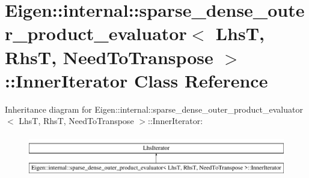\hypertarget{class_eigen_1_1internal_1_1sparse__dense__outer__product__evaluator_1_1_inner_iterator}{}\section{Eigen\+::internal\+::sparse\+\_\+dense\+\_\+outer\+\_\+product\+\_\+evaluator$<$ LhsT, RhsT, Need\+To\+Transpose $>$\+::Inner\+Iterator Class Reference}
\label{class_eigen_1_1internal_1_1sparse__dense__outer__product__evaluator_1_1_inner_iterator}
Inheritance diagram for Eigen\+::internal\+::sparse\+\_\+dense\+\_\+outer\+\_\+product\+\_\+evaluator$<$ LhsT, RhsT, Need\+To\+Transpose $>$\+::Inner\+Iterator\+:\begin{figure}[H]
\begin{center}
\leavevmode
\includegraphics[height=1.848185cm]{class_eigen_1_1internal_1_1sparse__dense__outer__product__evaluator_1_1_inner_iterator}
\end{center}
\end{figure}
